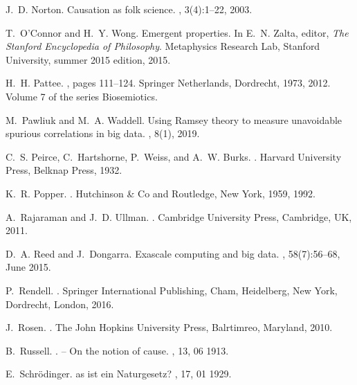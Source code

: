 \documentclass[12pt]{article}
\begin{document}
\begin{thebibliography}{10}
J.~D. Norton.
\newblock Causation as folk science.
, 3(4):1--22, 2003.

T.~O'Connor and H.~Y. Wong.
\newblock Emergent properties.
\newblock In E.~N. Zalta, editor, {\em The Stanford Encyclopedia of
  Philosophy}. Metaphysics Research Lab, Stanford University, summer 2015
  edition, 2015.

H.~H. Pattee.
, pages 111--124.
\newblock Springer Netherlands, Dordrecht, 1973, 2012.
\newblock Volume 7 of the series Biosemiotics.

M.~Pawliuk and M.~A. Waddell.
\newblock Using {R}amsey theory to measure unavoidable spurious correlations in
  big data.
, 8(1), 2019.

C.~S. Peirce, C.~Hartshorne, P.~Weiss, and A.~W. Burks.
.
\newblock Harvard University Press, Belknap Press, 1932.

K.~R. Popper.
.
\newblock Hutchinson \& Co and Routledge, New York, 1959, 1992.

A.~Rajaraman and J.~D. Ullman.
.
\newblock Cambridge University Press, Cambridge, UK, 2011.

D.~A. Reed and J.~Dongarra.
\newblock Exascale computing and big data.
, 58(7):56--68, June 2015.

P.~Rendell.
.
\newblock Springer International Publishing, Cham, Heidelberg, New York,
  Dordrecht, London, 2016.

J.~Rosen.
.
\newblock The John Hopkins University Press, Balrtimreo, Maryland, 2010.

B.~Russell.
. -- {O}n the notion of cause.
, 13, 06
  1913.

E.~Schr\"odinger.
as ist ein {N}aturgesetz?
, 17, 01 1929.


\end{thebibliography}
\end{document}
